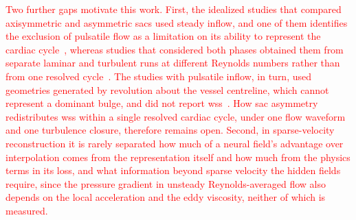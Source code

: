 \documentclass[12pt,a4paper]{article}
\newcommand{\WSS}{\ac{wss}\xspace}
\theoremstyle{definition}
\numberwithin{equation}{section}
\newcommand{\revision}[1]{\textcolor{red}{#1}}
\begin{document}
\revision{Two further gaps motivate this work. First, the idealized studies that compared axisymmetric and asymmetric sacs used steady inflow, and one of them identifies the exclusion of pulsatile flow as a limitation on its ability to represent the cardiac cycle~\cite{rehman2024comparative}, whereas studies that considered both phases obtained them from separate laminar and turbulent runs at different Reynolds numbers rather than from one resolved cycle~\cite{rehman2025application,moroni2025insight}. The studies with pulsatile inflow, in turn, used geometries generated by revolution about the vessel centreline, which cannot represent a dominant bulge, and did not report \WSS~\cite{jin2021arterial,guerrero2023efficient}. How sac asymmetry redistributes \WSS within a single resolved cardiac cycle, under one flow waveform and one turbulence closure, therefore remains open. Second, in sparse-velocity reconstruction it is rarely separated how much of a neural field's advantage over interpolation comes from the representation itself and how much from the physics terms in its loss, and what information beyond sparse velocity the hidden fields require, since the pressure gradient in unsteady Reynolds-averaged flow also depends on the local acceleration and the eddy viscosity, neither of which is measured.}
\end{document}
